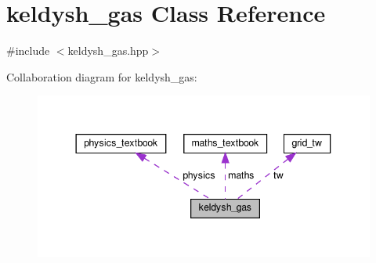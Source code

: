 \hypertarget{classkeldysh__gas}{}\section{keldysh\+\_\+gas Class Reference}
\label{classkeldysh__gas}


{\ttfamily \#include $<$keldysh\+\_\+gas.\+hpp$>$}



Collaboration diagram for keldysh\+\_\+gas\+:
\nopagebreak
\begin{figure}[H]
\begin{center}
\leavevmode
\includegraphics[width=344pt]{classkeldysh__gas__coll__graph}
\end{center}
\end{figure}
